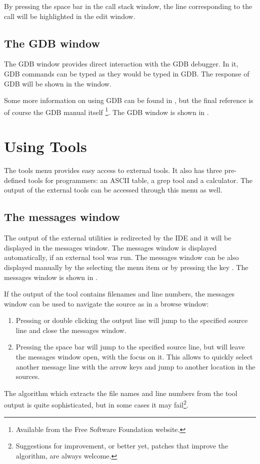 By pressing the space bar in the call stack window, the line corresponding
to the call will be highlighted in the edit window.

\subsection{The GDB window}
\label{se:gdbwindow}
The GDB window provides direct interaction with the GDB debugger.
In it, GDB commands can be typed as they would be typed in GDB.
The response of GDB will be shown in the window.

Some more information on using GDB can be found in , but
the final reference is of course the GDB manual itself
\footnote{Available from the Free Software Foundation website.}.
The GDB window is shown in .


\section{Using Tools}
\label{se:toolsmenu}
The tools menu provides easy access to external tools. It also has
three pre-defined tools for programmers: an ASCII table,  a grep tool
and a calculator. The output of the external tools can be accessed through
this menu as well.

%
%
\subsection{The messages window}
\label{se:toolsmessages}
The output of the external utilities is redirected by the IDE and it
will be displayed in the messages window. The messages window is
displayed automatically, if an external tool was run. The
messages window can be also displayed manually by the selecting the
menu item  or by pressing the key .
The messages window is shown in .


If the output of the tool contains filenames and line numbers,
the messages window can be used to navigate the source as in a browse
window:
\begin{enumerate}
\item Pressing  or double clicking the output line will jump
to the specified source line and close the messages window.
\item Pressing the space bar will jump to the specified source line, but
will leave the messages window open, with the focus on it. This allows to
quickly select another message line with the arrow keys and jump to
another location in the sources.
\end{enumerate}
The algorithm which extracts the file names and line numbers from
the tool output is quite sophisticated, but in some cases it may
fail\footnote{Suggestions for improvement, or better yet, patches
that improve the algorithm, are always welcome.}.
%
%
